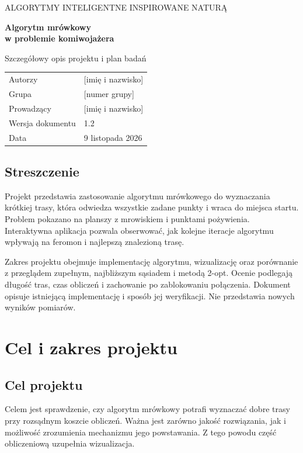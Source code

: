 \documentclass[11pt,a4paper]{article}
\newcommand{\rozdzial}[1]{\clearpage\section{#1}}
\begin{document}
{\small ALGORYTMY INTELIGENTNE INSPIROWANE NATURĄ}
\vspace{1cm}

{\LARGE\bfseries Algorytm mrówkowy\\[5pt]w problemie komiwojażera\par}
\vspace{0.4cm}
{\large Szczegółowy opis projektu i plan badań\par}
\vspace{0.7cm}

\begin{tabular}{@{}ll@{}}
Autorzy & [imię i nazwisko] \\
Grupa & [numer grupy] \\
Prowadzący & [imię i nazwisko] \\
Wersja dokumentu & 1.2 \\
Data & 9 listopada 2026
\end{tabular}

\vspace{0.7cm}
\subsection*{Streszczenie}
Projekt przedstawia zastosowanie algorytmu mrówkowego do wyznaczania krótkiej trasy, która odwiedza wszystkie zadane punkty i wraca do miejsca startu. Problem pokazano na planszy z mrowiskiem i punktami pożywienia. Interaktywna aplikacja pozwala obserwować, jak kolejne iteracje algorytmu wpływają na feromon i najlepszą znalezioną trasę.

Zakres projektu obejmuje implementację algorytmu, wizualizację oraz porównanie z przeglądem zupełnym, najbliższym sąsiadem i metodą 2-opt. Ocenie podlegają długość tras, czas obliczeń i zachowanie po zablokowaniu połączenia. Dokument opisuje istniejącą implementację i sposób jej weryfikacji. Nie przedstawia nowych wyników pomiarów.

\begingroup
\setlength{\parskip}{0pt}
\tableofcontents
\endgroup

\rozdzial{Cel i zakres projektu}
\subsection{Cel projektu}
Celem jest sprawdzenie, czy algorytm mrówkowy potrafi wyznaczać dobre trasy przy rozsądnym koszcie obliczeń. Ważna jest zarówno jakość rozwiązania, jak i możliwość zrozumienia mechanizmu jego powstawania. Z tego powodu część obliczeniową uzupełnia wizualizacja.
\end{document}
